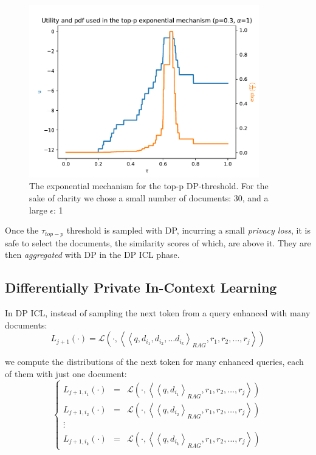\documentclass[
  12pt,
  a4paper,
]{article}
\begin{document}
\begin{figure}
\centering
\includegraphics[width=100mm,height=\textheight,keepaspectratio]{figures/top-p-exp.pdf}
\caption{The exponential mechanism for the top-p DP-threshold. For the
sake of clarity we chose a small number of documents: 30, and a large
\(\epsilon\): 1}\label{fig:toppexp}
\end{figure}

Once the \(\tau_{top-p}\) threshold is sampled with DP, incurring a
small \emph{privacy loss}, it is safe to select the documents, the
similarity scores of which, are above it. They are then
\emph{aggregated} with DP in the DP ICL phase.

\subsection{Differentially Private In-Context
Learning}\label{differentially-private-in-context-learning}

In DP ICL, instead of sampling the next token from a query enhanced with
many documents:
\[L_{j+1}(\cdot) = \mathcal{L}\left(\cdot, \left<\left<q, d_{i_1}, d_{i_2}, \ldots d_{i_k}\right>_{RAG}, r_1, r_2,\ldots, r_j\right>\right)\]

we compute the distributions of the next token for many enhanced
queries, each of them with just one document: \[\left\{\begin{matrix}
L_{j+1,i_1}(\cdot) &=& \mathcal{L}\left(\cdot, \left<\left<q, d_{i_1}\right>_{RAG}, r_1, r_2,\ldots, r_j\right>\right)\\
L_{j+1,i_2}(\cdot) &=&\mathcal{L}\left(\cdot, \left<\left<q, d_{i_2}\right>_{RAG}, r_1, r_2,\ldots, r_j\right>\right)\\
\vdots\\
L_{j+1,i_k}(\cdot) &=&\mathcal{L}\left(\cdot, \left<\left<q, d_{i_k}\right>_{RAG}, r_1, r_2,\ldots, r_j\right>\right)
\end{matrix}\right.\]
\end{document}
